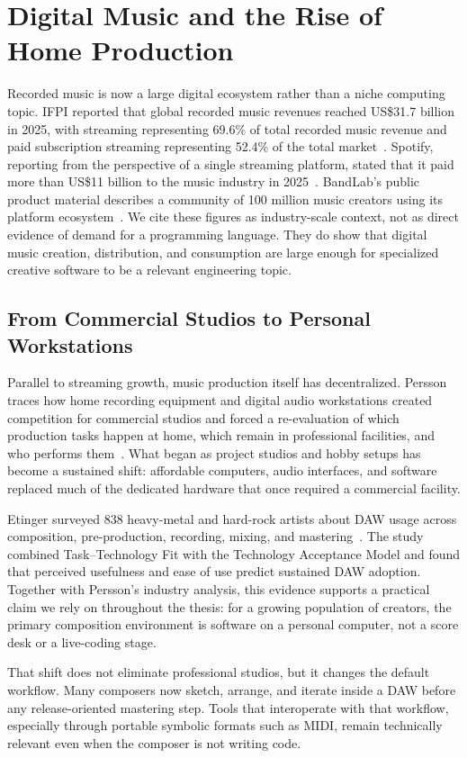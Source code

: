 \section{Digital Music and the Rise of Home Production}\label{sec:digital-music-domain}

Recorded music is now a large digital ecosystem rather than a niche computing topic.
IFPI reported that global recorded music revenues reached US\$31.7 billion in 2025, with streaming representing 69.6\%
of total recorded music revenue and paid subscription streaming representing 52.4\% of the total
market~\cite{IFPI_2026}.
Spotify, reporting from the perspective of a single streaming platform, stated that it paid more than US\$11 billion to
the music industry in 2025~\cite{Spotify_2026_Payouts}.
BandLab's public product material describes a community of 100 million music creators using its platform
ecosystem~\cite{BandLab_2026}.
We cite these figures as industry-scale context, not as direct evidence of demand for a programming language.
They do show that digital music creation, distribution, and consumption are large enough for specialized creative
software to be a relevant engineering topic.

\subsection{From Commercial Studios to Personal Workstations}\label{subsec:home-production-shift}

Parallel to streaming growth, music production itself has decentralized.
Persson traces how home recording equipment and digital audio workstations created competition for commercial
studios and forced a re-evaluation of which production tasks happen at home, which remain in professional
facilities, and who performs them~\cite{Persson_2006}.
What began as project studios and hobby setups has become a sustained shift: affordable computers, audio
interfaces, and software replaced much of the dedicated hardware that once required a commercial facility.

Etinger surveyed 838 heavy-metal and hard-rock artists about DAW usage across composition, pre-production,
recording, mixing, and mastering~\cite{Etinger_2016}.
The study combined Task--Technology Fit with the Technology Acceptance Model and found that perceived usefulness
and ease of use predict sustained DAW adoption.
Together with Persson's industry analysis, this evidence supports a practical claim we rely on throughout the
thesis: for a growing population of creators, the primary composition environment is software on a personal
computer, not a score desk or a live-coding stage.

That shift does not eliminate professional studios, but it changes the default workflow.
Many composers now sketch, arrange, and iterate inside a DAW before any release-oriented mastering step.
Tools that interoperate with that workflow, especially through portable symbolic formats such as MIDI, remain
technically relevant even when the composer is not writing code.
